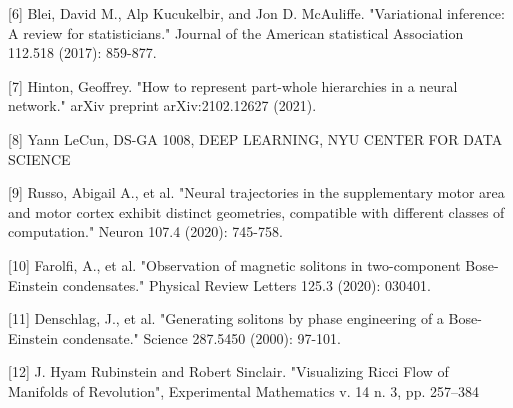\documentclass{article}
\begin{document}
[6] Blei, David M., Alp Kucukelbir, and Jon D. McAuliffe. "Variational inference: A review for statisticians." Journal of the American statistical Association 112.518 (2017): 859-877.


[7] Hinton, Geoffrey. "How to represent part-whole hierarchies in a neural network." arXiv preprint arXiv:2102.12627 (2021).

[8]  Yann LeCun, DS-GA 1008, DEEP LEARNING, NYU CENTER FOR DATA SCIENCE

[9] Russo, Abigail A., et al. "Neural trajectories in the supplementary motor area and motor cortex exhibit distinct geometries, compatible with different classes of computation." Neuron 107.4 (2020): 745-758.

[10] Farolfi, A., et al. "Observation of magnetic solitons in two-component Bose-Einstein condensates." Physical Review Letters 125.3 (2020): 030401.

[11] Denschlag, J., et al. "Generating solitons by phase engineering of a Bose-Einstein condensate." Science 287.5450 (2000): 97-101.

[12] J. Hyam Rubinstein and Robert Sinclair. "Visualizing Ricci Flow of Manifolds of Revolution", Experimental Mathematics v. 14 n. 3, pp. 257–384



\end{document}
